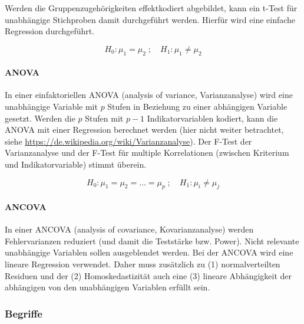 \documentclass{article}
\numberwithin{equation}{section}
\begin{document}
Werden die Gruppenzugehörigkeiten effektkodiert abgebildet, kann ein t-Test für unabhängige Stichproben damit durchgeführt werden. Hierfür wird eine einfache Regression durchgeführt.

\begin{equation}
H_0: \mu_1 = \mu_2 \; ; \quad H_1: \mu_1 \neq \mu_2
\end{equation}

\paragraph{ANOVA}

In einer einfaktoriellen ANOVA (analysis of variance, Varianzanalyse) wird eine unabhängige Variable mit $p$ Stufen in Beziehung zu einer abhängigen Variable gesetzt. Werden die $p$ Stufen mit ${p-1}$ Indikatorvariablen kodiert, kann die ANOVA mit einer Regression berechnet werden (hier nicht weiter betrachtet, siehe \hyperlink{https://de.wikipedia.org/wiki/Varianzanalyse}{https://de.wikipedia.org/wiki/Varianzanalyse}). Der F-Test der Varianzanalyse und der F-Test für multiple Korrelationen (zwischen Kriterium und Indikatorvariable) stimmt überein.

\begin{equation}
H_0: \mu_1 = \mu_2 = \dots = \mu_p \; ; \quad H_1: \mu_i \neq \mu_j
\end{equation}

\paragraph{ANCOVA}

In einer ANCOVA (analysis of covariance, Kovarianzanalyse) werden Fehlervarianzen reduziert (und damit die Teststärke bzw. Power). Nicht relevante unabhängige Variablen sollen ausgeblendet werden. Bei der ANCOVA wird eine lineare Regression verwendet. Daher muss zusätzlich zu (1) normalverteilten Residuen und der (2) Homoskedastizität auch eine (3) lineare Abhängigkeit der abhängigen von den unabhängigen Variablen erfüllt sein.

\subsubsection*{Begriffe}

\end{document}
